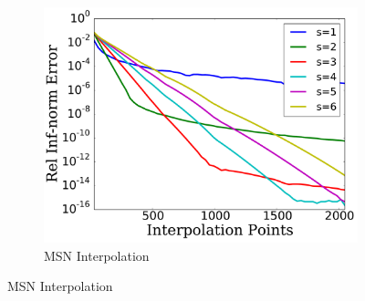 
\begin{figure}[p]
    \centering
    \begin{subfigure}{0.45\textwidth}
    \includegraphics[width=\textwidth]{plots/msn_interp_fast_2n_rough_runge_jump.pdf}
    \caption{MSN Interpolation}
    \end{subfigure}


\end{figure}

